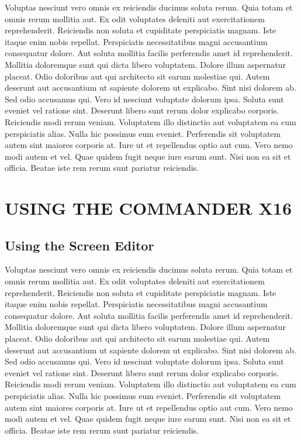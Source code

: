 \documentclass[
	11pt, %
	fleqn, %
	letterpaper, %
]{CommodoreBlueBook}
\begin{document}
Voluptas nesciunt vero omnis ex reiciendis ducimus soluta rerum. Quia totam et
omnis rerum mollitia aut. Ex odit voluptates deleniti aut exercitationem
reprehenderit. Reiciendis non soluta et cupiditate perspiciatis magnam. Iste
itaque enim nobis repellat. Perspiciatis necessitatibus magni accusantium
consequatur dolore. Aut soluta mollitia facilis perferendis amet id
reprehenderit. Mollitia doloremque sunt qui dicta libero voluptatem. Dolore
illum aspernatur placeat. Odio doloribus aut qui architecto sit earum molestiae
qui. Autem deserunt aut accusantium ut sapiente dolorem ut explicabo. Sint nisi
dolorem ab. Sed odio accusamus qui. Vero id nesciunt voluptate dolorum ipsa.
Soluta sunt eveniet vel ratione sint. Deserunt libero sunt rerum dolor
explicabo corporis. Reiciendis modi rerum veniam. Voluptatem illo distinctio
aut voluptatem ea cum perspiciatis alias. Nulla hic possimus eum eveniet.
Perferendis sit voluptatem autem sint maiores corporis at. Iure ut et
repellendus optio aut cum. Vero nemo modi autem et vel. Quae quidem fugit neque
iure earum sunt. Nisi non ea sit et officia. Beatae iste rem rerum sunt
pariatur reiciendis.

\makeatletter\@openrightfalse
\part{USING THE COMMANDER X16}

\chapter*{Using the Screen Editor}

Voluptas nesciunt vero omnis ex reiciendis ducimus soluta rerum. Quia totam et
omnis rerum mollitia aut. Ex odit voluptates deleniti aut exercitationem
reprehenderit. Reiciendis non soluta et cupiditate perspiciatis magnam. Iste
itaque enim nobis repellat. Perspiciatis necessitatibus magni accusantium
consequatur dolore. Aut soluta mollitia facilis perferendis amet id
reprehenderit. Mollitia doloremque sunt qui dicta libero voluptatem. Dolore
illum aspernatur placeat. Odio doloribus aut qui architecto sit earum molestiae
qui. Autem deserunt aut accusantium ut sapiente dolorem ut explicabo. Sint nisi
dolorem ab. Sed odio accusamus qui. Vero id nesciunt voluptate dolorum ipsa.
Soluta sunt eveniet vel ratione sint. Deserunt libero sunt rerum dolor
explicabo corporis. Reiciendis modi rerum veniam. Voluptatem illo distinctio
aut voluptatem ea cum perspiciatis alias. Nulla hic possimus eum eveniet.
Perferendis sit voluptatem autem sint maiores corporis at. Iure ut et
repellendus optio aut cum. Vero nemo modi autem et vel. Quae quidem fugit neque
iure earum sunt. Nisi non ea sit et officia. Beatae iste rem rerum sunt
pariatur reiciendis.
\end{document}
